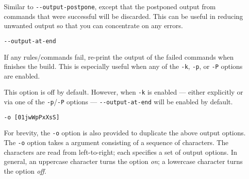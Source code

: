 Similar to \verb+--output-postpone+, except that the postponed output from commands that were
successful will be discarded. This can be useful in reducing unwanted output so that you can
concentrate on any errors.

 \verb+--output-at-end+

If any rules/commands fail, re-print the output of the failed commands when \OMake{} finishes the
build. This is especially useful when any of the \verb+-k+, \verb+-p+, or \verb+-P+ options are
enabled.

This option is off by default. However, when \verb+-k+ is enabled --- either explicitly or via one
of the \verb+-p+/\verb+-P+ options --- \verb+--output-at-end+ will be enabled by default.

 \verb+-o [01jwWpPxXsS]+

For brevity, the \verb+-o+ option is also provided to duplicate the above output options.  The
\verb+-o+ option takes a argument consisting of a sequence of characters.  The characters are read
from left-to-right; each specifies a set of output options.  In general, an uppercase character turns
the option \emph{on}; a lowercase character turns the option \emph{off}.

